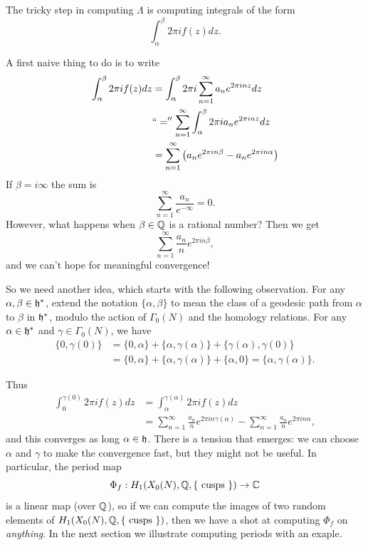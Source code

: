 \documentclass{book}
\begin{document}
The tricky step in computing $\Lambda$ is computing
integrals of the form
$$\int_{\alpha}^{\beta} 2\pi i f(z) dz.$$



A first naive thing to do is to write
\begin{align*}
\int_{\alpha}^{\beta} 2\pi i f(z) dz
 &=
 \int_{\alpha}^{\beta} 2\pi i \sum_{n=1}^{\infty} a_n e^{2\pi i n z} dz\\
 &``=''
 \sum_{n=1}^{\infty}
  \int_{\alpha}^{\beta} 2\pi i  a_n e^{2\pi i n z} dz\\
 &=
 \sum_{n=1}^{\infty} \left( a_n e^{2\pi i n \beta}  -   a_n e^{2\pi i n \alpha} \right)\\
\end{align*}
If $\beta=i\infty$ the sum is
$$
\sum_{n=1}^{\infty} \frac{a_n}{e^{-\infty}} = 0.
$$
However, what happens when $\beta\in\mathbb{Q}$ is a
rational number?  Then we get
$$
\sum_{n=1}^{\infty}  \frac{a_n}{n} e^{2\pi i n \beta},
$$
and we can't hope for meaningful convergence!



So we need another idea, which starts with the following
observation.  For any $\alpha,\beta\in\mathfrak{h}^*$, extend
the notation $\{\alpha,\beta\}$ to mean the class of a
geodesic path from $\alpha$ to $\beta$ in $\mathfrak{h}^*$, modulo
the action of $\Gamma_0(N)$ and the homology relations.
For any $\alpha\in \mathfrak{h}^*$ and $\gamma\in\Gamma_0(N)$, we have
\begin{align*}
\{0,\gamma(0)\} &=
\{0,\alpha\} + \{\alpha,\gamma(\alpha)\}
 + \{\gamma(\alpha),\gamma(0)\}\\
 &=\{0,\alpha\} + \{\alpha,\gamma(\alpha)\}
 + \{\alpha,0\} = \{\alpha,\gamma(\alpha)\}.
\end{align*}

Thus
\begin{align}\label{eqn:transport}
\int_{0}^{\gamma(0)} 2\pi i f(z) dz
 &= \int_{\alpha}^{\gamma(\alpha)} 2\pi i f(z) dz\\
 &= \sum_{n=1}^{\infty}  \frac{a_n}{n} e^{2\pi i n \gamma(\alpha)} -  \sum_{n=1}^{\infty}  \frac{a_n}{n} e^{2\pi i n \alpha},
\end{align}
and this converges as long $\alpha\in\mathfrak{h}$.
There is a tension that emerges: we
can choose $\alpha$ and $\gamma$
to make the convergence fast, but they might
not be useful.  In particular, the period map
$$
 \Phi_f: H_1(X_0(N),\mathbb{Q},\{\text{ cusps }\}) \to \mathbb{C}
$$
is a linear map (over $\mathbb{Q}$), so if we can compute the images
of two random elements of $H_1(X_0(N),\mathbb{Q},\{\text{ cusps }\})$,
then we have a shot at computing $\Phi_f$
on {\em anything}.  In the
next section we illustrate computing
periods with an exaple.
\end{document}
